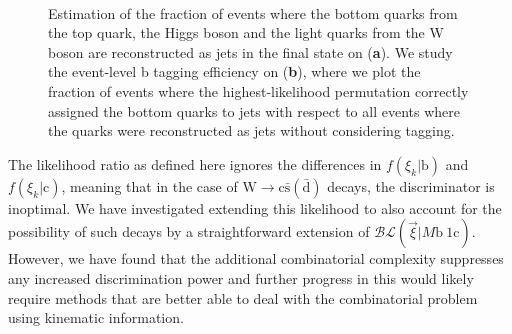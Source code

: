 \begin{figure}
\begin{centering}
\\
\caption{Estimation of the fraction of events where the bottom quarks from the top quark, the Higgs boson and the light quarks from the W boson are reconstructed as jets in the final state on (\textbf{a}). We study the event-level b tagging efficiency on (\textbf{b}), where we plot the fraction of events where the highest-likelihood permutation correctly assigned the bottom quarks to jets with respect to all events where the quarks were reconstructed as jets without considering tagging.}
\label{fig:blr_matching}
\end{centering}
\end{figure}
 
The likelihood ratio as defined here ignores the differences in $f(\xi_k | \mathrm{b})$ and $f(\xi_k | \mathrm{c})$, meaning that in the case of $\mathrm{W} \rightarrow \mathrm{c}\bar{\mathrm{s}} (\bar{\mathrm{d}})$ decays, the discriminator is inoptimal. We have investigated extending this likelihood to also account for the possibility of such decays by a straightforward extension of $\mathcal{BL}(\vec{\xi} | M\mathrm{b}~1\mathrm{c})$. However, we have found that the additional combinatorial complexity suppresses any increased discrimination power and further progress in this would likely require methods that are better able to deal with the combinatorial problem using kinematic information.

